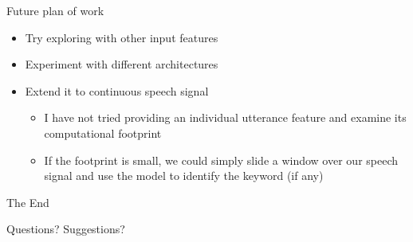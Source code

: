 \documentclass{beamer}
\begin{document}
\begin{frame}{Future plan of work}
    \begin{itemize}
        \item Try exploring with other input features
		\item Experiment with different architectures
		\item Extend it to continuous speech signal
			\begin{itemize}
				\item I have not tried providing an individual utterance feature and examine its computational footprint
				\item If the footprint is small, we could simply slide a window over our speech signal and use the model to identify the keyword (if any)
			\end{itemize}
	\end{itemize}
\end{frame}



\begin{frame}
\huge{\centerline{The End}}
\hspace{10em}
\huge{\centerline{Questions? Suggestions?}}
\end{frame}
\end{document}
